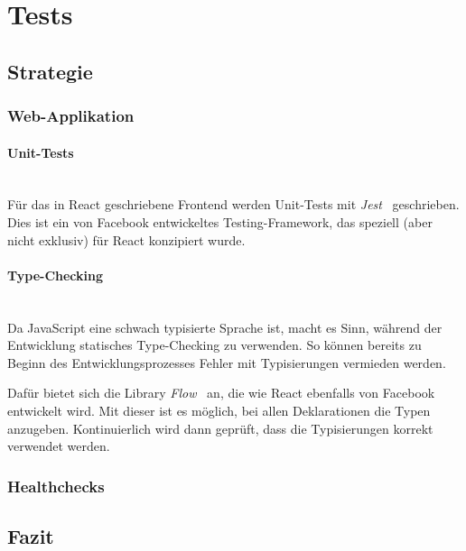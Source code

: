
\section{Tests}
\label{Tests}

\subsection{Strategie}
\label{Tests:Strategie}

\subsubsection{Web-Applikation}
\label{tests:Web-Applikation}

\paragraph{Unit-Tests}~\\
Für das in React geschriebene Frontend werden Unit-Tests mit \emph{Jest}~\cite{jest} geschrieben.
Dies ist ein von Facebook entwickeltes Testing-Framework, das speziell (aber nicht exklusiv) für React konzipiert wurde.



\paragraph{Type-Checking}~\\
Da JavaScript eine schwach typisierte Sprache ist, macht es Sinn, während der Entwicklung statisches Type-Checking zu verwenden.
So können bereits zu Beginn des Entwicklungsprozesses Fehler mit Typisierungen vermieden werden.

Dafür bietet sich die Library \emph{Flow}~\cite{flow} an, die wie React ebenfalls von Facebook entwickelt wird.
Mit dieser ist es möglich, bei allen Deklarationen die Typen anzugeben.
Kontinuierlich wird dann geprüft, dass die Typisierungen korrekt verwendet werden.



\subsubsection{Healthchecks}
\label{Tests:Healthchecks}


\subsection{Fazit}
\label{Tests:Fazit}

